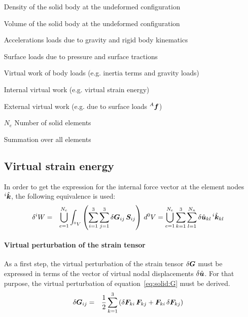 \begin{description}
\item[${^0}\rho$] Density of the solid body at the undeformed configuration
\item[${^0}\T{V}$] Volume of the solid body at the undeformed configuration
\item[$\T{b}$] Accelerations loads due to gravity and rigid body kinematics
\item[${^A}\T{f}$] Surface loads due to pressure and surface tractions
\item[${^m}W$] Virtual work of body loads (e.g. inertia terms and gravity loads)
\item[${^i}W$] Internal virtual work (e.g. virtual strain energy)
\item[${^e}W$] External virtual work (e.g. due to surface loads ${^A}\T{f}$)
\item{$N_e$} Number of solid elements
\item[$\bigcup$] Summation over all elements
\end{description}

\subsection{Virtual strain energy}
In order to get the expression for the internal force vector at the element nodes $^i\hat{\bm{k}}$, the following equivalence is used:
\begin{eqnarray}
\delta ^iW & = & \bigcup_{e=1}^{N_e} \int_{^0V} \left(\sum_{i=1}^3\sum_{j=1}^3 \delta \bm{G}_{ij} \, \bm{S}_{ij} \right) \, d^0V = \bigcup_{e=1}^{N_e}\sum_{k=1}^{3} \sum_{l=1}^{N_n} \delta \hat{\bm{u}}_{kl} \, ^i\hat{\bm{k}}_{kl} \label{eq:solid:deltaWi}
\end{eqnarray}

\paragraph{Virtual perturbation of the strain tensor}
As a first step, the virtual perturbation of the strain tensor $\delta\bm{G}$ must be expressed in terms of the vector of virtual nodal displacements $\delta\hat{\bm{u}}$.
For that purpose, the virtual perturbation of equation~\ref{eq:solid:G} must be derived.
\begin{eqnarray}
\delta \bm{G}_{ij} & = & \frac{1}{2} \sum_{k=1}^3\left(\delta \bm{F}_{ki} \, \bm{F}_{kj} + \bm{F}_{ki} \, \delta \bm{F}_{kj}\right) \label{eq:solid:deltaG}
\end{eqnarray}

